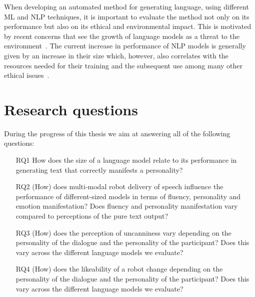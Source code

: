 \documentclass[nomenclature, english, biblatex]{kththesis}
\begin{document}
When developing an automated method for generating language, using different \gls{ML} and \gls{NLP} techniques, it is important to evaluate the method not only on its performance but also on its ethical and environmental impact. This is motivated by recent concerns that see the growth of language models as a threat to the environment~\cite{bender2021dangers}. The current increase in performance of \gls{NLP} models is generally given by an increase in their size which, however, also correlates with the resources needed for their training and the subsequent use among many other ethical issues~\cite{bender2021dangers}.

\section{Research questions}
\label{sec:rqs}
During the progress of this thesis we aim at answering all of the following questions:
\begin{itemize}
    \item[RQ1] \hypertarget{rqs:1}{How does the size of a language model relate to its performance in generating text that correctly manifests a personality?}
    \item[RQ2] \hypertarget{rqs:2}{(How) does multi-modal robot delivery of speech influence the performance of different-sized models in terms of fluency, personality and emotion manifestation? Does fluency and personality manifestation vary compared to perceptions of the pure text output?}
    \item[RQ3] (How) does the perception of uncanniness vary depending on the personality of the dialogue and the personality of the participant? Does this vary across the different language models we evaluate?
    \item[RQ4] (How) does the likeability of a robot change depending on the personality of the dialogue and the personality of the participant? Does this vary across the different language models we evaluate?
\end{itemize}
\end{document}
